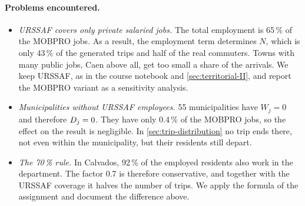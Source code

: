 \paragraph{Problems encountered.}
\begin{itemize}
  \item \emph{URSSAF covers only private salaried jobs.} The total employment is 65\,\% of the MOBPRO jobs. As a result,
  the employment term determines $N$, which is only 43\,\% of the generated trips and half of the real commuters.
  Towns with many public jobs, Caen above all, get too small a share of the arrivals. We keep URSSAF, as in the course
  notebook and \cref{sec:territorial-II}, and report the MOBPRO variant as a sensitivity analysis.
  \item \emph{Municipalities without URSSAF employees.} 55 municipalities have $W_j = 0$ and therefore $D_j = 0$. They
  have only 0.4\,\% of the MOBPRO jobs, so the effect on the result is negligible. In \cref{sec:trip-distribution} no
  trip ends there, not even within the municipality, but their residents still depart.
  \item \emph{The 70\,\% rule.} In Calvados, 92\,\% of the employed residents also work in the department. The factor
  0.7 is therefore conservative, and together with the URSSAF coverage it halves the number of trips. We apply the
  formula of the assignment and document the difference above.
\end{itemize}
